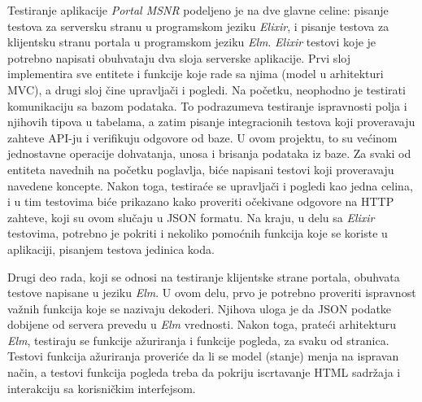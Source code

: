 \documentclass[12pt,oneside]{memoir}
\begin{document}
\par Testiranje aplikacije \emph{Portal MSNR} podeljeno je na dve glavne celine: pisanje testova za serversku stranu u programskom jeziku \emph{Elixir}, i pisanje testova za klijentsku stranu portala u programskom jeziku \emph{Elm}. \emph{Elixir} testovi koje je potrebno napisati obuhvataju dva sloja serverske aplikacije. Prvi sloj implementira sve entitete i funkcije koje rade sa njima (model u arhitekturi MVC), a drugi sloj čine upravljači i pogledi. Na početku, neophodno je testirati komunikaciju sa bazom podataka. To podrazumeva testiranje ispravnosti polja i njihovih tipova u tabelama, a zatim pisanje integracionih testova koji proveravaju zahteve API-ju i verifikuju odgovore od baze. U ovom projektu, to su većinom jednostavne operacije dohvatanja, unosa i brisanja podataka iz baze. Za svaki od entiteta navednih na početku poglavlja, biće napisani testovi koji proveravaju navedene koncepte. Nakon toga, testiraće se upravljači i pogledi kao jedna celina, i u tim testovima biće prikazano kako proveriti očekivane odgovore na HTTP zahteve, koji su ovom slučaju u JSON formatu. Na kraju, u delu sa \emph{Elixir} testovima, potrebno je pokriti i nekoliko pomoćnih funkcija koje se koriste u aplikaciji, pisanjem testova jedinica koda.
\par Drugi deo rada, koji se odnosi na testiranje klijentske strane portala, obuhvata testove napisane u jeziku \emph{Elm}. U ovom delu, prvo je potrebno proveriti ispravnost važnih funkcija koje se nazivaju dekoderi. Njihova uloga je da JSON podatke dobijene od servera prevedu u \emph{Elm} vrednosti. Nakon toga, prateći arhitekturu \emph{Elm}, testiraju se funkcije ažuriranja i funkcije pogleda, za svaku od stranica. Testovi funkcija ažuriranja proveriće da li se model (stanje) menja na ispravan način, a testovi funkcija pogleda treba da pokriju iscrtavanje HTML sadržaja i interakciju sa korisničkim interfejsom.
\end{document}
